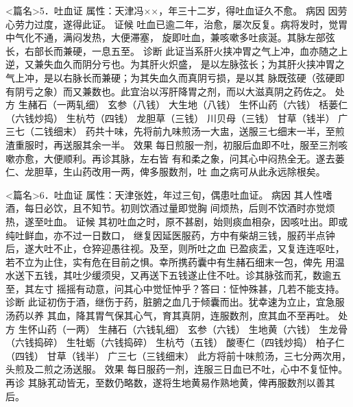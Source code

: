 \documentclass[a4paper,12pt,UTF8,twoside]{ctexbook}
\begin{document}
<篇名>5．吐血证
属性：天津冯××，年三十二岁，得吐血证久不愈。 
病因 因劳心劳力过度，遂得此证。 
证候 吐血已逾二年，治愈，屡次反复。病将发时，觉胃中气化不通，满闷发热，大便滞塞， 
旋即吐血，兼咳嗽多吐痰涎。其脉左部弦长，右部长而兼硬，一息五至。 
诊断 此证当系肝火挟冲胃之气上冲，血亦随之上逆，又兼失血久而阴分亏也。为其肝火炽盛， 
是以左脉弦长；为其肝火挟冲胃之气上冲，是以右脉长而兼硬；为其失血久而真阴亏损，是以其 
脉既弦硬（弦硬即有阴亏之象）而又兼数也。此宜治以泻肝降胃之剂，而以大滋真阴之药佐之。 
处方 生赭石（一两轧细） 玄参（八钱） 大生地（八钱） 生怀山药（六钱） 
栝蒌仁（六钱炒捣） 生杭芍（四钱） 龙胆草（三钱） 川贝母（三钱） 
甘草（钱半） 广三七（二钱细末） 
药共十味，先将前九味煎汤一大盅，送服三七细末一半，至煎渣重服时，再送服其余一半。 
效果 每日煎服一剂，初服后血即不吐，服至三剂咳嗽亦愈，大便顺利。再诊其脉，左右皆 
有和柔之象，问其心中闷热全无。遂去蒌仁、龙胆草，生山药改用一两，俾多服数剂，吐 
血之病可从此永远除根矣。 


<篇名>6．吐血证
属性：天津张姓，年过三旬，偶患吐血证。 
病因 其人性嗜酒，每日必饮，且不知节。初则饮酒过量即觉胸 
间烦热，后则不饮酒时亦觉烦热，遂至吐血。 
证候 其初吐血之时，原不甚剧，始则痰血相杂，因咳吐出。即或纯吐鲜血，亦不过一日数口， 
继复因延医服药，方中有柴胡三钱，服药半点钟后，遂大吐不止，仓猝迎愚往视。及至，则所吐之血 
已盈痰盂，又复连连呕吐，若不立为止住，实有危在目前之惧。幸所携药囊中有生赭石细末一包，俾先 
用温水送下五钱，其吐少缓须臾，又再送下五钱遂止住不吐。诊其脉弦而芤，数逾五至，其左寸 
摇摇有动意，问其心中觉怔忡乎？答曰∶怔忡殊甚，几若不能支持。 
诊断 此证初伤于酒，继伤于药，脏腑之血几于倾囊而出。犹幸速为立止，宜急服汤药以养 
其血，降其胃气保其心气，育其真阴，连服数剂，庶其血不至再吐。 
处方 生怀山药（一两） 生赭石（六钱轧细） 玄参（六钱） 生地黄（六钱） 
生龙骨（六钱捣碎） 生牡蛎（六钱捣碎） 生杭芍（五钱） 酸枣仁（四钱炒捣） 
柏子仁（四钱） 甘草（钱半） 广三七（三钱细末） 
此方将前十味煎汤，三七分两次用，头煎及二煎之汤送服。 
效果 每日服药一剂，连服三日血已不吐，心中不复怔忡。再诊 
其脉芤动皆无，至数仍略数，遂将生地黄易作熟地黄，俾再服数剂以善其后。 
\end{document}
